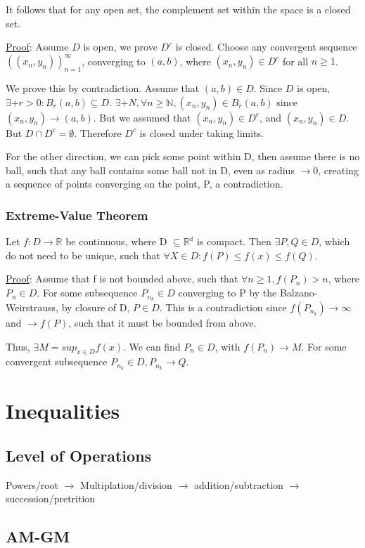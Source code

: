 It follows that for any open set, the complement set within the space is a closed set.

\underline{Proof}:
Assume $D$ is open, we prove $D^c$ is closed. Choose any convergent sequence
$((x_n, y_n))_{n = 1}^\infty$, converging to $(a, b)$, where $(x_n, y_n) \in
D^c$ for all $n \geq 1$.

We prove this by contradiction. Assume that $(a, b) \in D$. Since $D$ is open,
$\exists+ r > 0:B_r(a, b)\subseteq D$. $\exists+ N, \forall n \geq
\mathbb{N}, (x_n, y_n) \in B_r(a, b)$ since $(x_n, y_n)\to(a,b)$. But we
assumed that $(x_n, y_n) \in D^c$, and $(x_n, y_n) \in D$. But $D \cap D^c =
\emptyset$. Therefore $D^c$ is closed under taking limits.

For the other direction, we can pick some point within D, then assume there is no ball, such that any ball contains some ball not in D, even as radius $\to 0$, creating a sequence of points converging on the point, P, a contradiction.

\subsubsection{Extreme-Value Theorem}
Let $f:D \to \mathbb{R}$ be continuous, where D $\subseteq \mathbb{R^d}$ is compact. Then $\exists P, Q \in D$, which do not need to be unique, such that $\forall X \in D: f(P) \leq f(x) \leq f(Q)$.

\underline{Proof}:
Assume that f is not bounded above, such that $\forall n \geq 1, f(P_n) > n$, where $P_n \in D$. For some subsequence $P_{n_k} \in D$ converging to P by the Balzano-Weirstrauss, by closure of D, $P \in D$. This is a contradiction since $f(P_{n_k}) \to \infty$ and $\to f(P)$, such that it must be bounded from above.

Thus, $\exists M = sup_{x \in D}f(x)$. We can find $P_n \in D$, with $f(P_n) \to M$. For some convergent subsequence $P_{n_k} \in D, P_{n_k} \to Q$.

\section{Inequalities}
\subsection{Level of Operations}
Powers/root $\to$ Multiplation/division $\to$ addition/subtraction $\to$
succession/pretrition
\subsection{AM-GM}

